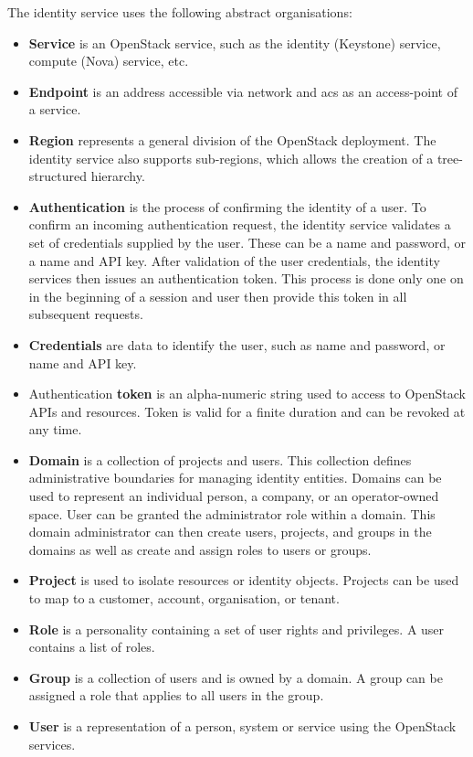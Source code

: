 The identity service uses the following abstract organisations:
\begin{itemize}
  \item{\textbf{Service} is an OpenStack service, such as the identity (Keystone) service, compute (Nova) service, etc.}
  \item{\textbf{Endpoint} is an address accessible via network and acs as an access-point of a service.}
  \item{\textbf{Region} represents a general division of the OpenStack deployment. The identity service also supports sub-regions, which allows the creation of a tree-structured hierarchy.}
  \item{\textbf{Authentication} is the process of confirming the identity of a user. To confirm an incoming authentication request, the identity service validates a set of credentials supplied by the user. These can be a name and password, or a name and API key. After validation of the user credentials, the identity services then issues an authentication token. This process is done only one on in the beginning of a session and user then provide this token in all subsequent requests.}
  \item{\textbf{Credentials} are data to identify the user, such as name and password, or name and API key.}
  \item{Authentication \textbf{token} is an alpha-numeric string used to access to OpenStack APIs and resources. Token is valid for a finite duration and can be revoked at any time.}
  \item{\textbf{Domain} is a collection of projects and users. This collection defines administrative boundaries for managing identity entities. Domains can be used to represent an individual person, a company, or an operator-owned space. User can be granted the administrator role within a domain. This domain administrator can then create users, projects, and groups in the domains as well as create and assign roles to users or groups.}
  \item{\textbf{Project} is used to isolate resources or identity objects. Projects can be used to map to a customer, account, organisation, or tenant.}
  \item{\textbf{Role} is a personality containing a set of user rights and privileges. A user contains a list of roles.}
  \item{\textbf{Group} is a collection of users and is owned by a domain. A group can be assigned a role that applies to all users in the group.}
  \item{\textbf{User} is a representation of a person, system or service using the OpenStack services.}
  \\\cite{CL210}
\end{itemize}


